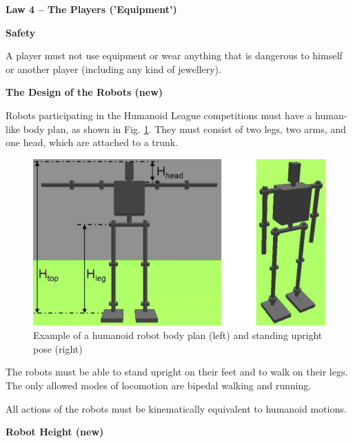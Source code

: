 \clearpage
\sffamily
{\bfseries\color[rgb]{0.4,0.4,0.4}
Law 4 -- The Players ('Equipment')}

\bigskip

{\bfseries Safety }

\headlinebox

A player must not use equipment or wear anything that is dangerous to himself or another player (including any kind of jewellery).

\bigskip

{\bfseries The Design of the Robots (new)}

\headlinebox

Robots participating in the Humanoid League competitions must have a human-like body plan, as shown in Fig. \ref{fig:bodyplan}. They must consist of two legs, two arms, and one head, which are attached to a trunk.

\begin{center}
\begin{figure}[h]
\includegraphics[width=\textwidth]{img/bodyplan.png}
\caption{Example of a humanoid robot body plan (left) and standing upright pose (right)}
\label{fig:bodyplan}
\end{figure}
\end{center}

The robots must be able to stand upright on their feet and to walk on their legs. The only allowed modes of locomotion are bipedal walking and running.

\bigskip

All actions of the robots must be kinematically equivalent to humanoid motions.

\bigskip

{\bfseries Robot Height (new)}

